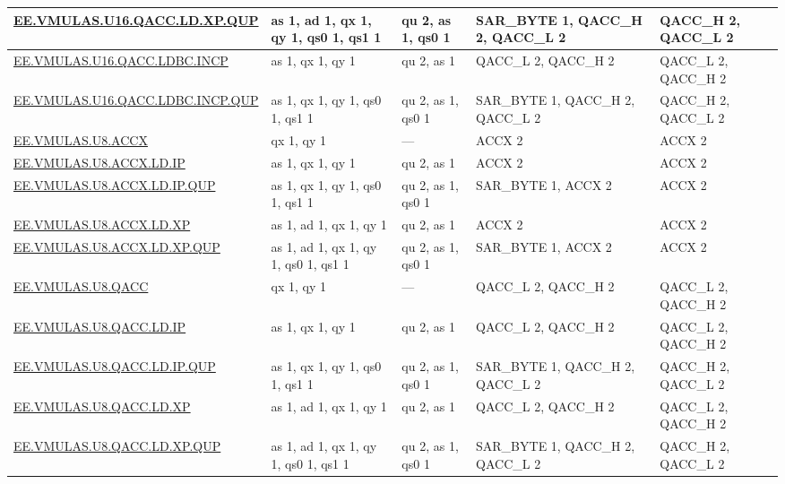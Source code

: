 \begin{longtable}[c]{|l|m{2.5cm}|m{2.5cm}|m{2.5cm}|m{2.5cm}|}
    \hyperref[instruction:EEVMULASU16QACCLDXPQUP]{EE.VMULAS.U16.QACC.LD.XP.QUP} & as 1, ad 1, qx 1, qy 1, qs0 1, qs1 1 & qu 2, as 1, qs0 1 & SAR\_BYTE 1, QACC\_H 2, QACC\_L 2 & QACC\_H 2, QACC\_L 2\\\hline
    \hyperref[instruction:EEVMULASU16QACCLDBCINCP]{EE.VMULAS.U16.QACC.LDBC.INCP} & as 1, qx 1, qy 1 & qu 2, as 1 & QACC\_L 2, QACC\_H 2 & QACC\_L 2, QACC\_H 2\\\hline
    \hyperref[instruction:EEVMULASU16QACCLDBCINCPQUP]{EE.VMULAS.U16.QACC.LDBC.INCP.QUP} & as 1, qx 1, qy 1, qs0 1, qs1 1 & qu 2, as 1, qs0 1 & SAR\_BYTE 1, QACC\_H 2, QACC\_L 2 & QACC\_H 2, QACC\_L 2\\\hline
    \hyperref[instruction:EEVMULASU8ACCX]{EE.VMULAS.U8.ACCX} & qx 1, qy 1 & — & ACCX 2 & ACCX 2\\\hline
    \hyperref[instruction:EEVMULASU8ACCXLDIP]{EE.VMULAS.U8.ACCX.LD.IP} & as 1, qx 1, qy 1 & qu 2, as 1 & ACCX 2 & ACCX 2\\\hline
    \hyperref[instruction:EEVMULASU8ACCXLDIPQUP]{EE.VMULAS.U8.ACCX.LD.IP.QUP} & as 1, qx 1, qy 1, qs0 1, qs1 1 & qu 2, as 1, qs0 1 & SAR\_BYTE 1, ACCX 2 & ACCX 2\\\hline
    \hyperref[instruction:EEVMULASU8ACCXLDXP]{EE.VMULAS.U8.ACCX.LD.XP} & as 1, ad 1, qx 1, qy 1 & qu 2, as 1 & ACCX 2 & ACCX 2\\\hline
    \hyperref[instruction:EEVMULASU8ACCXLDXPQUP]{EE.VMULAS.U8.ACCX.LD.XP.QUP} & as 1, ad 1, qx 1, qy 1, qs0 1, qs1 1 & qu 2, as 1, qs0 1 & SAR\_BYTE 1, ACCX 2 & ACCX 2\\\hline
    \hyperref[instruction:EEVMULASU8QACC]{EE.VMULAS.U8.QACC} & qx 1, qy 1 & — & QACC\_L 2, QACC\_H 2 & QACC\_L 2, QACC\_H 2\\\hline
    \hyperref[instruction:EEVMULASU8QACCLDIP]{EE.VMULAS.U8.QACC.LD.IP} & as 1, qx 1, qy 1 & qu 2, as 1 & QACC\_L 2, QACC\_H 2 & QACC\_L 2, QACC\_H 2\\\hline
    \hyperref[instruction:EEVMULASU8QACCLDIPQUP]{EE.VMULAS.U8.QACC.LD.IP.QUP} & as 1, qx 1, qy 1, qs0 1, qs1 1 & qu 2, as 1, qs0 1 & SAR\_BYTE 1, QACC\_H 2, QACC\_L 2 & QACC\_H 2, QACC\_L 2\\\hline
    \hyperref[instruction:EEVMULASU8QACCLDXP]{EE.VMULAS.U8.QACC.LD.XP} & as 1, ad 1, qx 1, qy 1 & qu 2, as 1 & QACC\_L 2, QACC\_H 2 & QACC\_L 2, QACC\_H 2\\\hline
    \hyperref[instruction:EEVMULASU8QACCLDXPQUP]{EE.VMULAS.U8.QACC.LD.XP.QUP} & as 1, ad 1, qx 1, qy 1, qs0 1, qs1 1 & qu 2, as 1, qs0 1 & SAR\_BYTE 1, QACC\_H 2, QACC\_L 2 & QACC\_H 2, QACC\_L 2\\\hline

\end{longtable}
